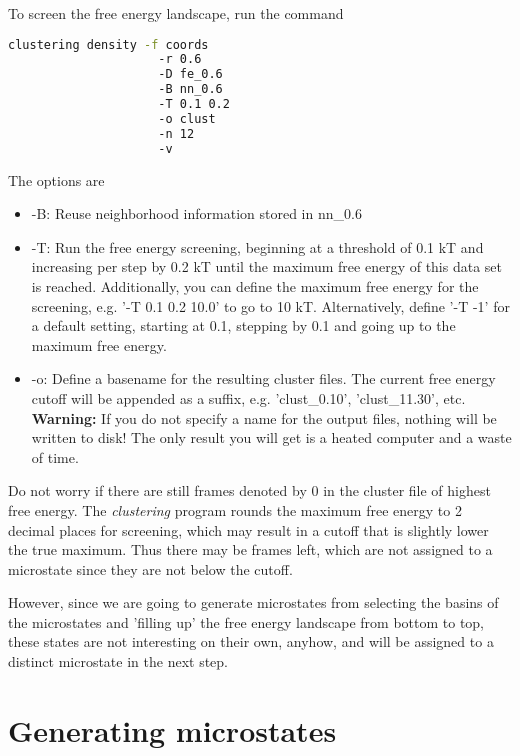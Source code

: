 \documentclass[12pt,a4paper,twoside,english,fleqn]{article}
\begin{document}
To screen the free energy landscape, run the command
\begin{lstlisting}[language=bash,basicstyle=\ttfamily]
  clustering density -f coords
                     -r 0.6
                     -D fe_0.6
                     -B nn_0.6
                     -T 0.1 0.2
                     -o clust
                     -n 12
                     -v
\end{lstlisting}
The options are
\begin{itemize}
  \item -B: Reuse neighborhood information stored in nn\_0.6
  \item -T: Run the free energy screening, beginning at a threshold of 0.1 kT
            and increasing per step by 0.2 kT until the maximum free energy
            of this data set is reached.
            Additionally, you can define the maximum free energy for the screening,
            e.g. '-T 0.1 0.2 10.0' to go to 10 kT.
            Alternatively, define '-T -1' for a default setting, starting at 0.1, stepping by 0.1
            and going up to the maximum free energy.
  \item -o: Define a basename for the resulting cluster files. The current free energy cutoff will be
            appended as a suffix, e.g. 'clust\_0.10', 'clust\_11.30', etc.
            \textbf{Warning:} If you do not specify a name for the output files, nothing will be written
            to disk! The only result you will get is a heated computer and a waste of time.
\end{itemize}

Do not worry if there are still frames denoted by 0 in the cluster file of highest free energy.
The \emph{clustering} program rounds the maximum free energy to 2 decimal places for screening,
which may result in a cutoff that is slightly lower the true maximum. Thus there may be frames left,
which are not assigned to a microstate since they are not below the cutoff.

However, since we are going to generate microstates from selecting the basins of the microstates
and 'filling up' the free energy landscape from bottom to top, these states are not interesting on their own, anyhow,
and will be assigned to a distinct microstate in the next step.


\section{Generating microstates}
\end{document}
